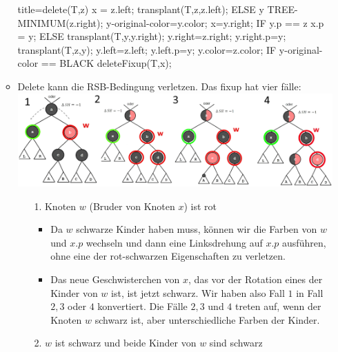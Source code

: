 \documentclass[
    12pt,
    a4paper,
    ngerman,
    color=3b,%
    marginpar=false,
    colorback=false,
    leqno,
]{tudaexercise}
\begin{document}
\begin{itemize}
\begin{itemize}
\begin{ccode}[autogobble,fontsize=\small]{title={delete(T,z)}}
                        x = z.left;
                        transplant(T,z,z.left);
                    ELSE
                        y TREE-MINIMUM(z.right);
                        y-original-color=y.color;
                        x=y.right;
                        IF y.p == z
                            x.p = y;
                        ELSE
                            transplant(T,y,y.right);
                            y.right=z.right;
                            y.right.p=y;
                        transplant(T,z,y);
                        y.left=z.left;
                        y.left.p=y;
                        y.color=z.color;
                    IF y-original-color == BLACK
                        deleteFixup(T,x);
                \end{ccode}
                \clearpage
                \item Delete kann die RSB-Bedingung verletzen. Das fixup hat vier fälle:\\
                \includegraphics[width=\textwidth-2cm]{pictures/deleteFixuoRBTCases.png}
                \begin{itemize}
                    \item[1.] Knoten $w$ (Bruder von Knoten $x$) ist rot
                    \begin{itemize}
                        \item Da $w$ schwarze Kinder haben muss, können wir die Farben von $w$ und $x.p$ wechseln und dann eine Linksdrehung auf $x.p$ ausführen, ohne eine der rot-schwarzen Eigenschaften zu verletzen.
                        \item Das neue Geschwisterchen von $x$, das vor der Rotation eines der Kinder von $w$ ist, ist jetzt schwarz. Wir haben also Fall $1$ in Fall $2, 3$ oder $4$ konvertiert.
                        Die Fälle $ 2, 3$ und $4$ treten auf, wenn der Knoten $w$ schwarz ist, aber unterschiedliche Farben der Kinder.
                    \end{itemize}
                    \item[2.] $w$ ist schwarz und beide Kinder von $w$ sind schwarz
                    \begin{itemize}

\end{itemize}
\end{itemize}
\end{itemize}
\end{itemize}
\end{document}
